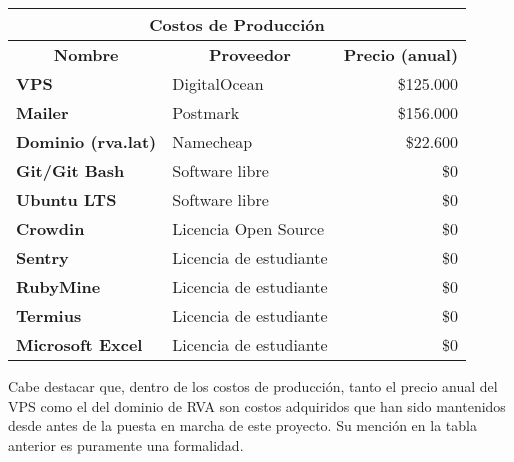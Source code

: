 \begin{center}
	\begin{tabular}{ | l | p{5cm} | p{5cm}|}
		\hline
		\multicolumn{3}{|c|}{\textbf{Costos de Producción}} \\
		\hline
		\multicolumn{1}{|c|}{\textbf{Nombre}} & \multicolumn{1}{|c|}{\textbf{Proveedor}} & \multicolumn{1}{|c|}{\textbf{Precio (anual)}} \\
		\hline
		{\textbf{VPS}} & DigitalOcean & \multicolumn{1}{|r|}{\$125.000} \\ \hline
		
		{\textbf{Mailer}} & Postmark & \multicolumn{1}{|r|}{\$156.000} \\ \hline
		
		{\textbf{Dominio (rva.lat)}} & Namecheap & \multicolumn{1}{|r|}{\$22.600} \\ \hline
    
		{\textbf{Git/Git Bash}} & Software libre & \multicolumn{1}{|r|}{\$0} \\ \hline
		
		{\textbf{Ubuntu LTS}} & Software libre & \multicolumn{1}{|r|}{\$0} \\ \hline
    
    {\textbf{Crowdin}} & Licencia Open Source & \multicolumn{1}{|r|}{\$0} \\ \hline
    
    {\textbf{Sentry}} & Licencia de estudiante & \multicolumn{1}{|r|}{\$0} \\ \hline
		
		{\textbf{RubyMine}} & Licencia de estudiante & \multicolumn{1}{|r|}{\$0} \\ \hline
		
		{\textbf{Termius}} & Licencia de estudiante & \multicolumn{1}{|r|}{\$0} \\ \hline
		
		{\textbf{Microsoft Excel}} & Licencia de estudiante & \multicolumn{1}{|r|}{\$0} \\ \hline
	\end{tabular}

  \label{table:costs:production}
\end{center}

Cabe destacar que, dentro de los costos de producción, tanto el precio anual del VPS como el del dominio de RVA son costos adquiridos que han sido mantenidos desde antes de la puesta en marcha de este proyecto. Su mención en la tabla anterior es puramente una formalidad.

